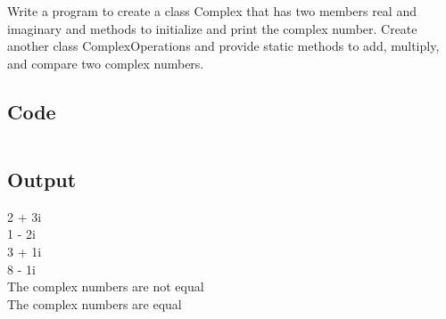 \documentclass[../main.tex]{subfiles}
\begin{document}
Write a program to create a class Complex that has two members real and
imaginary and methods to initialize and print the complex number. Create
another class ComplexOperations and provide static methods to add, multiply,
and compare two complex numbers.

\subsection{Code}
\inputminted[frame=lines, breaklines, breakanywhere, numberblanklines=false]{java}{./programs/prog2/Complex.java}

\subsection{Output}
2 + 3i \\
1 - 2i \\
3 + 1i \\
8 - 1i \\
The complex numbers are not equal \\
The complex numbers are equal \\
\end{document}
